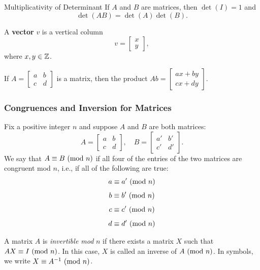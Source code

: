 \documentclass[letterpaper]{article}
\begin{document}
\begin{theorem}{Multiplicativity of Determinant}{}
    If $A$ and $B$ are matrices, then $\det(I) = 1$ and \[\det(AB) = \det(A)\det(B).\]
\end{theorem}

\begin{definition}{}{}
    A \textbf{vector} $v$ is a vertical column \[v = \begin{bmatrix}
        x \\ y
    \end{bmatrix},\] where $x, y \in \mathbb{Z}$. 
\end{definition}

\begin{definition}{}{}
    If $A = \begin{bmatrix}
        a & b \\ c & d
    \end{bmatrix}$ is a matrix, then the product $Ab = \begin{bmatrix}
        ax + by \\ 
        cx + dy
    \end{bmatrix}$.
\end{definition}

\subsubsection{Congruences and Inversion for Matrices}
\begin{definition}{}{}
    Fix a positive integer $n$ and suppose $A$ and $B$ are both matrices: 
    \[A = \begin{bmatrix}
        a & b \\ c & d
    \end{bmatrix}, \quad B = \begin{bmatrix}
        a' & b' \\ c' & d'
    \end{bmatrix}.\] We say that $A \equiv B \ (\mathrm{mod}\ n)$ if all four of the entries of the two matrices are congruent mod $n$, i.e., if all of the following are true:  
    \[a \equiv a' \ (\mathrm{mod}\ n)\] 
    \[b \equiv b' \ (\mathrm{mod}\ n)\] 
    \[c \equiv c' \ (\mathrm{mod}\ n)\]
    \[d \equiv d' \ (\mathrm{mod}\ n)\]
\end{definition}

\begin{definition}{}{}
    A matrix $A$ is \emph{invertible mod} $n$ if there exists a matrix $X$ such that $AX \equiv I \ (\mathrm{mod}\ n)$. In this case, $X$ is called an inverse of $A \ (\mathrm{mod}\ n)$. In symbols, we write $X \equiv A^{-1} \ (\mathrm{mod}\ n)$. 
\end{definition}
\end{document}
